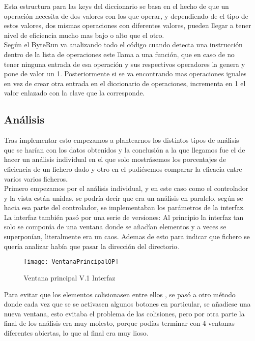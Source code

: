 Esta estructura para las keys del diccionario se basa en el hecho de que un operación necesita de dos valores con los que operar, y dependiendo de el tipo de estos valores, dos mismas operaciones con diferentes valores, pueden llegar a tener nivel de eficiencia mucho mas bajo o alto que el otro. \\

Según el ByteRun va analizando todo el código cuando detecta una instrucción dentro de la lista de operaciones este llama a una función, que en caso de no tener ninguna entrada de esa operación y sus respectivos operadores la genera y pone de valor un 1. Posteriormente si se va encontrando mas operaciones iguales en vez de crear otra entrada en el diccionario de operaciones, incrementa en 1 el valor enlazado con la clave que la corresponde.\\

\subsection{Análisis}
Tras implementar esto empezamos a plantearnos los distintos tipos de análisis que se harían con los datos obtenidos y la conclusión a la que llegamos fue el  de hacer un análisis individual en el que solo mostrásemos los porcentajes de eficiencia de un fichero dado y otro en el pudiésemos comparar la eficacia entre varios varios ficheros.\\

Primero  empezamos por el análisis individual, y en este caso como el controlador y la vista están unidas, se podría  decir que era un análisis en paralelo, según se hacia esa parte del controlador, se implementaban los parámetros de la interfaz.\\

La interfaz también pasó por una serie de versiones:
 Al principio la interfaz tan solo se componía de una ventana donde se añadían elementos  y a veces se  superponían, literalmente era un caos. Ademas de esto para indicar que fichero se quería analizar había que pasar la dirección del directorio.\\
 
\begin{figure}[H]
\centering
\texttt{[image: VentanaPrincipalOP]}
\caption{Ventana principal V.1 Interfaz}
\end{figure}

Para evitar que los elementos colisionasen entre ellos , se pasó a otro  método donde cada vez que se se activasen algunos botones en particular, se añadiese una nueva ventana, esto  evitaba el problema de las colisiones, pero por otra parte la final de los análisis era muy molesto, porque  podías terminar con 4 ventanas diferentes abiertas, lo que al final era muy lioso.\\

